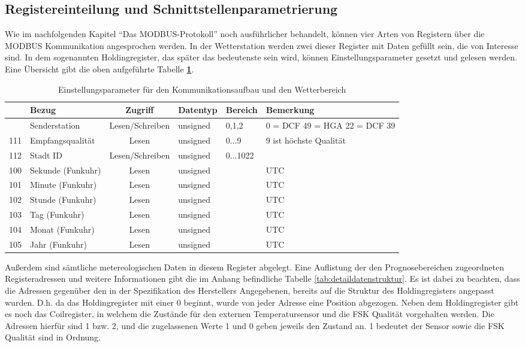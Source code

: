 \subsection{Registereinteilung und Schnittstellenparametrierung}
Wie im nachfolgenden Kapitel \enquote{Das MODBUS-Protokoll} noch ausführlicher behandelt, können vier Arten von Registern über die MODBUS Kommunikation angesprochen werden. In der Wetterstation werden zwei dieser Register mit Daten gefüllt sein, die von Interesse sind. In dem sogenannten Holdingregister, das später das bedeutenste sein wird, können Einstellungsparameter gesetzt und gelesen werden.\label{comsetreg} Eine Übersicht gibt die oben aufgeführte Tabelle \textbf{\ref{tab:kommeinstpara}}.
\begin{table}[t]
\caption{Einstellungsparameter für den Kommunikationsaufbau und den Wetterbereich}
{
\setlength{\extrarowheight}{0.1cm}
\begin{tabular}{| c | l | c | l | l | p{2.5cm} |}
\hline
\textbf{\parbox[t]{1.8cm}{Register-\\adresse}} & \textbf{Bezug} & \textbf{Zugriff} & \textbf{Datentyp} & \textbf{Bereich} & \textbf{Bemerkung}\\[1cm]
\hline \hline
\hiderowcolors
110 & Senderstation & Lesen/Schreiben & unsigned & 0,1,2 & 0 = DCF 49 \newline 1 = HGA 22 \newline 2 = DCF 39\\
111 & Empfangsqualität & Lesen & unsigned & 0...9 & 9 ist höchste Qualität\\
112 & Stadt ID & Lesen/Schreiben & unsigned & 0...1022 & \\
100 & Sekunde (Funkuhr) & Lesen & unsigned & & UTC\\ 
101 & Minute (Funkuhr) & Lesen & unsigned & & UTC\\
102 & Stunde (Funkuhr) & Lesen & unsigned & & UTC\\
103 & Tag (Funkuhr) & Lesen & unsigned & & UTC\\
104 & Monat (Funkuhr) & Lesen & unsigned & & UTC\\
105 & Jahr (Funkuhr) & Lesen & unsigned & & UTC\\
\hline
\end{tabular}
}
\label{tab:kommeinstpara}
\end{table} 
Außerdem sind sämtliche metereologischen Daten in diesem Register abgelegt. Eine Auflistung der den Prognosebereichen zugeordneten Registeradressen und weitere Informationen gibt die im Anhang befindliche Tabelle \ref{tab:detaildatenstruktur}. Es ist dabei zu beachten, dass die Adressen gegenüber den in der Spezifikation des Herstellers Angegebenen, bereits auf die Struktur des Holdingregisters angepasst wurden. D.h. da das Holdingregister mit einer 0 beginnt, wurde von jeder Adresse eine Position abgezogen. Neben dem Holdingregister gibt es noch das Coilregister, in welchem die Zustände für den externen Temperatursensor und die FSK Qualität vorgehalten werden. Die Adressen hierfür sind 1 bzw. 2, und die zugelassenen Werte 1 und 0 geben jeweils den Zustand an. 1 bedeutet der Sensor sowie die FSK Qualität sind in Ordnung.\label{coilabfrage} 
